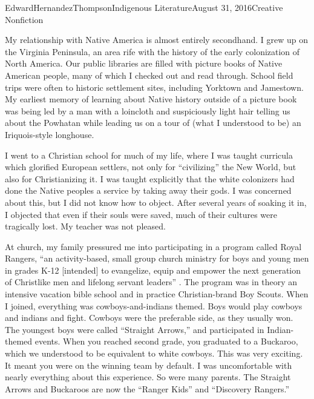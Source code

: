 \documentclass[12pt,letterpaper]{article}
\begin{document}
\begin{mla}{Edward}{Hernandez}{Thompson}{Indigenous Literature}{August 31, 2016}{Creative Nonfiction}

My relationship with Native America is almost entirely secondhand.  I grew up
on the Virginia Peninsula, an area rife with the history of the early
colonization of North America. Our public libraries are filled with picture
books of Native American people, many of which I checked out and read through.
School field trips were often to historic settlement sites, including Yorktown
and Jamestown. My earliest memory of learning about Native history outside of a
picture book was being led by a man with a loincloth and suspiciously light
hair telling us about the Powhatan while leading us on a tour of (what I
understood to be) an Iriquois-style longhouse.

I went to a Christian school for much of my life, where I was taught curricula
which glorified European settlers, not only for ``civilizing'' the New World,
but also for Christianizing it. I was taught explicitly that the white
colonizers had done the Native peoples a service by taking away their gods. I
was concerned about this, but I did not know how to object. After several years
of soaking it in, I objected that even if their souls were saved, much of their
cultures were tragically lost. My teacher was not pleased.

At church, my family pressured me into participating in a program called Royal
Rangers, ``an activity-based, small group church ministry for boys and young
men in grades K-12 [intended] to evangelize, equip and empower the next
generation of Christlike men and lifelong servant leaders''
\autocite{RoyalRangers}. The program was in theory an intensive vacation bible
school and in practice Christian-brand Boy Scouts. When I joined, everything
was cowboys-and-indians themed. Boys would play cowboys and indians and fight.
Cowboys were the preferable side, as they usually won. The youngest boys were
called ``Straight Arrows,'' and participated in Indian-themed events. When you
reached second grade, you graduated to a Buckaroo, which we understood to be
equivalent to white cowboys. This was very exciting. It meant you were on the
winning team by default. I was uncomfortable with nearly everything about this
experience. So were many parents. The Straight Arrows and Buckaroos are now the
``Ranger Kids'' and ``Discovery Rangers.''


\end{mla}
\end{document}
